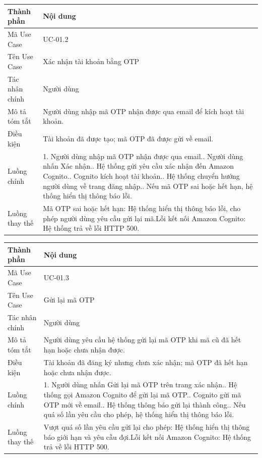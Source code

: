 \vspace{0.5cm}
\noindent\begin{tabular}{|p{3.5cm}|p{10.5cm}|}
\hline
\textbf{Thành phần} & \textbf{Nội dung} \\
\hline
Mã Use Case & UC-01.2 \\
\hline
Tên Use Case & Xác nhận tài khoản bằng OTP \\
\hline
Tác nhân chính & Người dùng \\
\hline
Mô tả tóm tắt & Người dùng nhập mã OTP nhận được qua email để kích hoạt tài khoản. \\
\hline
Điều kiện & Tài khoản đã được tạo; mã OTP đã được gửi về email. \\
\hline
Luồng chính & 1. Người dùng nhập mã OTP nhận được qua email.\newline 2. Người dùng nhấn Xác nhận.\newline 3. Hệ thống gửi yêu cầu xác nhận đến Amazon Cognito.\newline 4. Cognito kích hoạt tài khoản.\newline 5. Hệ thống chuyển hướng người dùng về trang đăng nhập.\newline 6. Nếu mã OTP sai hoặc hết hạn, hệ thống hiển thị thông báo lỗi. \\
\hline
Luồng thay thế & Mã OTP sai hoặc hết hạn: Hệ thống hiển thị thông báo lỗi, cho phép người dùng yêu cầu gửi lại mã.\newline Lỗi kết nối Amazon Cognito: Hệ thống trả về lỗi HTTP 500. \\
\hline
\end{tabular}

\vspace{0.5cm}
\noindent\begin{tabular}{|p{3.5cm}|p{10.5cm}|}
\hline
\textbf{Thành phần} & \textbf{Nội dung} \\
\hline
Mã Use Case & UC-01.3 \\
\hline
Tên Use Case & Gửi lại mã OTP \\
\hline
Tác nhân chính & Người dùng \\
\hline
Mô tả tóm tắt & Người dùng yêu cầu hệ thống gửi lại mã OTP khi mã cũ đã hết hạn hoặc chưa nhận được. \\
\hline
Điều kiện & Tài khoản đã đăng ký nhưng chưa xác nhận; mã OTP đã hết hạn hoặc chưa nhận được. \\
\hline
Luồng chính & 1. Người dùng nhấn Gửi lại mã OTP trên trang xác nhận.\newline 2. Hệ thống gọi Amazon Cognito để gửi lại mã OTP.\newline 3. Cognito gửi mã OTP mới về email.\newline 4. Hệ thống thông báo gửi lại thành công.\newline 5. Nếu quá số lần yêu cầu cho phép, hệ thống hiển thị thông báo lỗi. \\
\hline
Luồng thay thế & Vượt quá số lần yêu cầu gửi lại cho phép: Hệ thống hiển thị thông báo giới hạn và yêu cầu đợi.\newline Lỗi kết nối Amazon Cognito: Hệ thống trả về lỗi HTTP 500. \\
\hline
\end{tabular}

